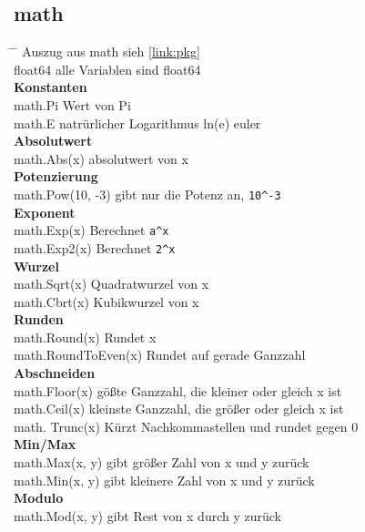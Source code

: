 \documentclass[twoside,a4paper,12pt]{article}
\begin{document}
\subsection{math}
\label{sec:math}
\begin{tabbing}
 \hspace{2mm} \= \hspace{50mm} \= \kill
 \> Auszug aus math \>  sieh \ref{link:pkg} \\
 \> float64 \> alle Variablen sind float64 \\
 \> \textbf{Konstanten} \\ 
 \> math.Pi \> Wert von Pi \\ 
 \> math.E \> natrürlicher Logarithmus ln(e) euler \\ 
 \> \textbf{Absolutwert} \\
 \> math.Abs(x)\> absolutwert von x \\ 
 \> \textbf{Potenzierung} \\ 
 \> math.Pow(10, -3)\> gibt nur die Potenz an, \verb|10^-3| \\
 \> \textbf{Exponent} \\ 
 \> math.Exp(x)  \> Berechnet \verb|a^x| \\ 
 \> math.Exp2(x)\> Berechnet \verb|2^x| \\
 \> \textbf{Wurzel} \\ 
 \> math.Sqrt(x)\> Quadratwurzel von x \\ 
 \> math.Cbrt(x)\> Kubikwurzel von x \\
 \> \textbf{Runden} \\
 \> math.Round(x)\> Rundet x \\ 
 \> math.RoundToEven(x)\> Rundet auf gerade Ganzzahl \\ 
 \> \textbf{Abschneiden} \\ 
 \> math.Floor(x)\> gößte Ganzzahl, die kleiner oder gleich x ist \\ 
 \> math.Ceil(x)\> kleinste Ganzzahl, die größer oder gleich x ist \\ 
 \> math. Trunc(x)\> Kürzt Nachkommastellen und rundet gegen 0 \\ 
 \> \textbf{Min/Max} \\ 
 \> math.Max(x, y)\> gibt größer Zahl von x und y zurück \\ 
 \> math.Min(x, y)\> gibt kleinere Zahl von x und y zurück \\ 
 \> \textbf{Modulo} \\ 
 \> math.Mod(x, y)\> gibt Rest von x durch y zurück \\ 

\end{tabbing}
\end{document}
